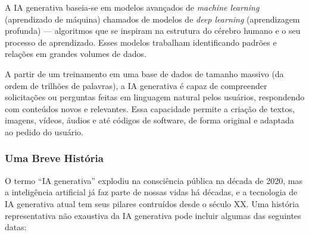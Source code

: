 \documentclass[a4paper, 12pt]{article}
\begin{document}
    A IA generativa baseia-se em modelos avançados de \textit{machine learning} (aprendizado de máquina) chamados de modelos de \textit{deep learning} (aprendizagem profunda) — algoritmos que se inspiram na estrutura do cérebro humano e o seu processo de aprendizado. Esses modelos trabalham identificando padrões e relações em grandes volumes de dados.

    A partir de um treinamento em uma base de dados de tamanho massivo (da ordem de trilhões de palavras), a IA generativa é capaz de compreender solicitações ou perguntas feitas em linguagem natural pelos usuários, respondendo com conteúdos novos e relevantes. Essa capacidade permite a criação de textos, imagens, vídeos, áudios e até códigos de software, de forma original e adaptada ao pedido do usuário.


    \subsubsection{Uma Breve História}

    O termo ``IA generativa'' explodiu na consciência pública na década de 2020, mas a inteligência artificial já faz parte de nossas vidas há décadas, e a tecnologia de IA generativa atual tem seus pilares contruídos desde o século XX. Uma história representativa não exaustiva da IA generativa pode incluir algumas das seguintes datas:
\end{document}
